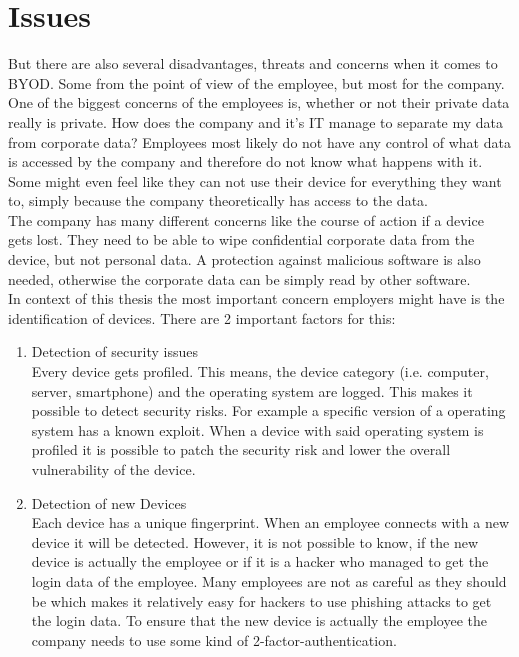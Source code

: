\section{Issues}
But there are also several disadvantages, threats and concerns when it comes to BYOD. Some from the point of view of the employee, but most for the company. \\
One of the biggest concerns of the employees is, whether or not their private data really is private. How does the company and it's IT manage to separate my data from corporate data? Employees most likely do not have any control of what data is accessed by the company and therefore do not know what happens with it. Some might even feel like they can not use their device for everything they want to, simply because the company theoretically has access to the data. \\
The company has many different concerns like the course of action if a device gets lost. They need to be able to wipe confidential corporate data from the device, but not personal data. A protection against malicious software is also needed, otherwise the corporate data can be simply read by other software. \\
In context of this thesis the most important concern employers might have is the identification of devices. There are 2 important factors for this:
\begin{enumerate}
	\item Detection of security issues \\
	Every device gets profiled. This means, the device category (i.e. computer, server, smartphone) and the operating system are logged. This makes it possible to detect security risks. For example a specific version of a operating system has a known exploit. When a device with said operating system is profiled it is possible to patch the security risk and lower the overall vulnerability of the device.
	\item Detection of new Devices \\
	Each device has a unique fingerprint. When an employee connects with a new device it will be detected. However, it is not possible to know, if the new device is actually the employee or if it is a hacker who managed to get the login data of the employee. Many employees are not as careful as they should be which makes it relatively easy for hackers to use phishing attacks to get the login data. To ensure that the new device is actually the employee the company needs to use some kind of 2-factor-authentication. 
\end{enumerate}
